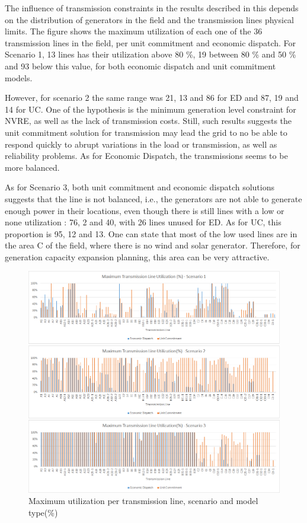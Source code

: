 \documentclass[12pt,LUDisStyle,twosided]{book}
\begin{document}
The influence of transmission constraints in the results described in this depends on the distribution of generators in the field and the transmission lines physical limits. The figure \label{fig:maximumutilizaton} shows the maximum utilization of each one of the 36 transmission lines in the field, per unit commitment and economic dispatch. For Scenario 1, 13 lines has their utilization above 80 \%,  19 between 80 \% and 50 \% and 93 below this value, for both economic dispatch and unit commitment models. 

However, for scenario 2 the same range was 21, 13 and 86 for ED and 87, 19 and 14 for UC. One of the hypothesis is the minimum generation level constraint for NVRE, as well as the lack of transmission costs. Still, such results suggests the unit commitment solution for transmission may lead the grid to no be able to respond quickly to abrupt variations in the load or transmission, as well as reliability problems. As for Economic Dispatch, the transmissions seems to be more balanced.

As for Scenario 3, both unit commitment and economic dispatch solutions suggests that the line is not balanced, i.e., the generators are not able to generate enough power in their locations, even though there is still lines with a low or none utilization : 76, 2 and 40, with 26 lines unused for ED. As for UC, this proportion is 95, 12 and 13. One can state that most of the low used lines are in the area C of the field, where there is no wind and solar generator. Therefore, for generation capacity expansion planning, this area can be very attractive.

\begin{figure}[!h] 
  \centering
  
	  \includegraphics[width=\textwidth,height=\textheight,keepaspectratio]{MaximumTransmissionLineUtilization.png}
  
  \caption{Maximum utilization per transmission line, scenario and model type(\%)}
  \label{fig:maximumutilizaton}
\end{figure}
\end{document}
